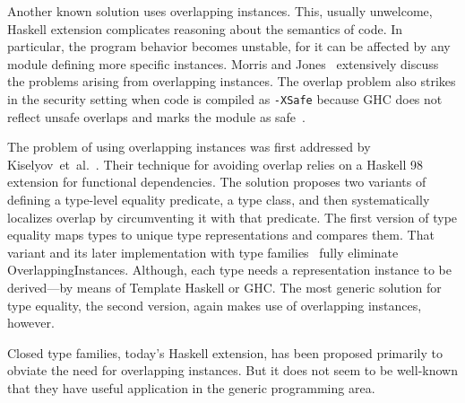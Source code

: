 \documentclass[runningheads]{llncs}
\newcommand{\K}[1]{\lstinline{#1}}
\begin{document}
Another known solution uses overlapping instances. This, usually unwelcome, Haskell extension complicates reasoning about the semantics of code. In particular, the program behavior becomes unstable, for it can be affected by any module defining more specific instances. Morris and Jones~\cite{Morris2010} extensively discuss the problems arising from overlapping instances.
The overlap problem also strikes in the security setting when code is compiled as \K{-XSafe} because GHC does not reflect unsafe overlaps and marks the module as safe~\cite{sh-overlapping}.

The problem of using overlapping instances was first addressed by Kiselyov~et~al.~\cite{Kiselyov2004}. Their technique for avoiding overlap relies on a Haskell 98 extension for functional dependencies. The solution proposes two variants of defining a type-level equality predicate, a type class, and then systematically localizes overlap by circumventing it with that predicate. The first version of type equality maps types to unique type representations and compares them. That variant and its later implementation with type families~\cite{Kiselyov2012} fully eliminate \textsf{OverlappingInstances}. Although, each type needs a representation instance to be derived---by means of Template Haskell or GHC. The most generic solution for type equality, the second version, again makes use of overlapping instances, however.

Closed type families, today's Haskell extension, has been proposed primarily to obviate the need for overlapping instances. But it does not seem to be well-known that they have useful application in the generic programming area.
\end{document}
